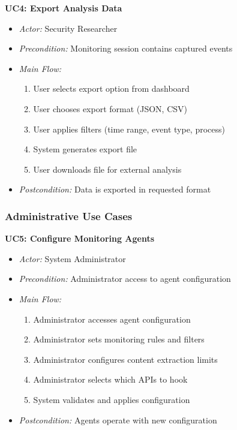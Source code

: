 \textbf{UC4: Export Analysis Data}
\begin{itemize}
    \item \textit{Actor:} Security Researcher
    \item \textit{Precondition:} Monitoring session contains captured events
    \item \textit{Main Flow:}
    \begin{enumerate}
        \item User selects export option from dashboard
        \item User chooses export format (JSON, CSV)
        \item User applies filters (time range, event type, process)
        \item System generates export file
        \item User downloads file for external analysis
    \end{enumerate}
    \item \textit{Postcondition:} Data is exported in requested format
\end{itemize}

\subsubsection{Administrative Use Cases}

\textbf{UC5: Configure Monitoring Agents}
\begin{itemize}
    \item \textit{Actor:} System Administrator
    \item \textit{Precondition:} Administrator access to agent configuration
    \item \textit{Main Flow:}
    \begin{enumerate}
        \item Administrator accesses agent configuration
        \item Administrator sets monitoring rules and filters
        \item Administrator configures content extraction limits
        \item Administrator selects which APIs to hook
        \item System validates and applies configuration
    \end{enumerate}
    \item \textit{Postcondition:} Agents operate with new configuration
\end{itemize}

